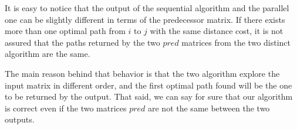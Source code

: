 It is easy to notice that the output of the sequential algorithm and the parallel one can be slightly different in terms of the predecessor matrix. If there exists more than one optimal path from \(i\) to \(j\) with the same distance cost, it is not assured that the paths returned by the two \(pred\) matrices from the two distinct algorithm are the same. 

The main reason behind that behavior is that the two algorithm explore the input matrix in different order, and the first optimal path found will be the one to be returned by the output. That said, we can say for sure that our algorithm is correct even if the two matrices \(pred\) are not the same between the two outputs.

\FloatBarrier
